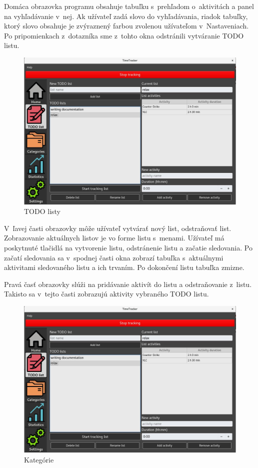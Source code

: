 \documentclass[]{article}
\begin{document}
Domáca obrazovka programu obsahuje tabuľku s~prehľadom o~aktivitách a panel na vyhľadávanie v~nej. Ak užívateľ zadá slovo do vyhľadávania, riadok tabuľky, ktorý slovo obsahuje je zvýraznený farbou zvolenou užívateľom v~Nastaveniach. Po pripomienkach z~dotazníka sme z~tohto okna odstránili vytváranie TODO listu.

\newpage
\begin{figure}[h!]
	\includegraphics[width=\textwidth]{todo_listy}
	\caption{TODO listy}
\end{figure}

V~ľavej časti obrazovky môže užívateľ vytvárať nový list, odstraňovať list. Zobrazovanie aktuálnych listov je vo forme listu s~menami. Užívateľ má poskytnuté tlačidlá na vytvorenie listu, odstránenie listu a začatie sledovania. Po začatí sledovania sa v~spodnej časti okna zobrazí tabuľka s~aktuálnymi aktivitami sledovaného listu a ich trvaním. Po dokončení listu tabuľka zmizne. 

Pravá časť obrazovky slúži na pridávanie aktivít do listu a odstraňovanie z~listu. Takisto sa v~tejto časti zobrazujú aktivity vybraného TODO listu.

\newpage

\begin{figure}[h!]
	\includegraphics[width=\textwidth]{todo_listy}
	\caption{Kategórie}
\end{figure}
\end{document}
